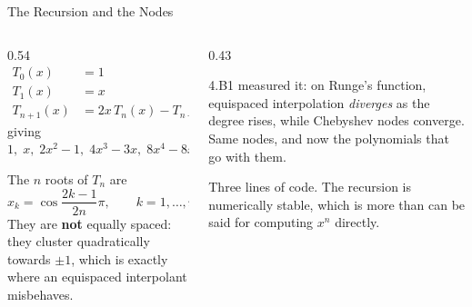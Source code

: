 \begin{frame}{The Recursion and the Nodes}
\begin{columns}[T]
\begin{column}{0.54\textwidth}
\small
\begin{align*}
T_0(x)&=1\\
T_1(x)&=x\\
T_{n+1}(x)&=2x\,T_n(x)-T_{n-1}(x)
\end{align*}
giving $1,\;x,\;2x^{2}-1,\;4x^{3}-3x,\;8x^{4}-8x^{2}+1,\dots$
\medskip

The $n$ roots of $T_n$ are
\[
  x_k=\cos\frac{2k-1}{2n}\pi,\qquad k=1,\dots,n .
\]
They are \textbf{not} equally spaced: they cluster quadratically towards $\pm1$, which is exactly where an equispaced interpolant misbehaves.
\end{column}
\begin{column}{0.43\textwidth}
\begin{conceptbox}[title=\textbf{Where you have seen this}]\small
4.B1 measured it: on Runge's function, equispaced interpolation \emph{diverges} as the degree rises, while Chebyshev nodes converge. Same nodes, and now the polynomials that go with them.
\end{conceptbox}
\medskip
\begin{examplebox}\footnotesize
Three lines of code. The recursion is numerically stable, which is more than can be said for computing $x^{n}$ directly.
\end{examplebox}
\end{column}
\end{columns}
\vspace{1mm}
\end{frame}

